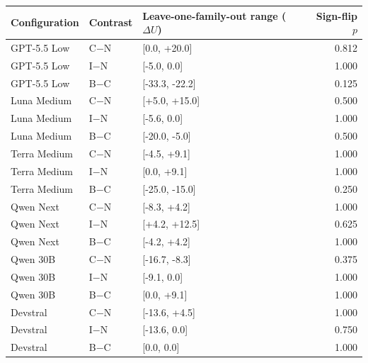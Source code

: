 \begin{tabular}{lllr}
\toprule
Configuration & Contrast & Leave-one-family-out range ($\Delta U$) & Sign-flip $p$\\
\midrule
GPT-5.5 Low & C$-$N & [0.0, +20.0] & 0.812\\
GPT-5.5 Low & I$-$N & [-5.0, 0.0] & 1.000\\
GPT-5.5 Low & B$-$C & [-33.3, -22.2] & 0.125\\
Luna Medium & C$-$N & [+5.0, +15.0] & 0.500\\
Luna Medium & I$-$N & [-5.6, 0.0] & 1.000\\
Luna Medium & B$-$C & [-20.0, -5.0] & 0.500\\
Terra Medium & C$-$N & [-4.5, +9.1] & 1.000\\
Terra Medium & I$-$N & [0.0, +9.1] & 1.000\\
Terra Medium & B$-$C & [-25.0, -15.0] & 0.250\\
Qwen Next & C$-$N & [-8.3, +4.2] & 1.000\\
Qwen Next & I$-$N & [+4.2, +12.5] & 0.625\\
Qwen Next & B$-$C & [-4.2, +4.2] & 1.000\\
Qwen 30B & C$-$N & [-16.7, -8.3] & 0.375\\
Qwen 30B & I$-$N & [-9.1, 0.0] & 1.000\\
Qwen 30B & B$-$C & [0.0, +9.1] & 1.000\\
Devstral & C$-$N & [-13.6, +4.5] & 1.000\\
Devstral & I$-$N & [-13.6, 0.0] & 0.750\\
Devstral & B$-$C & [0.0, 0.0] & 1.000\\
\bottomrule
\end{tabular}
